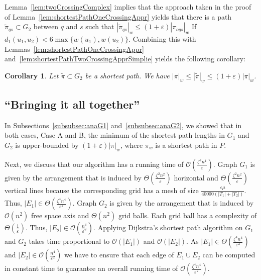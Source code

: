\documentclass[a4paper,11pt]{article}
\newtheorem{corollary}{Corollary}
\begin{document}
	Lemma~\ref{lem:twoCrossingComplex} implies that the  approach taken in the proof of Lemma~\ref{lem:shortestPathOneCrossingAppr} yields that there is a path $\widetilde{\pi}_{qs} \subset G_2$ between $q$ and $s$ such that $|\widetilde{\pi}_{qs}|_w \leq (1+\varepsilon) |\pi_{oqs}|_w$ If $d_1(u_1,u_2) < 6 \max \{ w(u_1), w(u_2) \}$. Combining this with Lemmas~\ref{lem:shortestPathOneCrossingAppr} and~\ref{lem:shortestPathTwoCrossingApprSimplie} yields the following corollary:

\begin{corollary}\label{cor:apprC2}
	Let $\widetilde{\pi} \subset G_2$ be a shortest path. We have $|\pi|_w \leq |\widetilde{\pi}|_w \leq (1+\varepsilon)|\pi|_w$.
\end{corollary}

\subsection{``Bringing it all together''}

	In Subsections~\ref{subsubsec:anaG1} and~\ref{subsubsec:anaG2}, we showed that in both  cases, Case A and B,  the minimum of the shortest path lengths in $G_1$ and $G_2$ is upper-bounded by $(1+\varepsilon)|\pi|_w$, where $\pi_w$ is a shortest path in $P$. 

	Next, we discuss that our algorithm has a running time of $\mathcal{O}(\frac{\zeta^4 n^4}{\varepsilon})$. Graph $G_1$ is given by the arrangement that is induced by $\Theta(\frac{\zeta^2 n^2}{\varepsilon})$ horizontal and $\Theta(\frac{\zeta^2 n^2}{\varepsilon})$ vertical lines because the corresponding grid has a mesh of size  $\frac{\varepsilon \mu}{40000 (|T_1| + |T_2|)}$. Thus, $|E_1| \in \Theta(\frac{\zeta^4 n^4}{\varepsilon^2})$. Graph	$G_2$ is given by the arrangement that is induced by $\mathcal{O}(n^2)$ free space axis and $\Theta(n^2)$ grid balls. Each grid ball has a complexity of $\Theta (\frac{1}{\varepsilon})$. Thus, $|E_2| \in \mathcal{O}(\frac{n^4}{\varepsilon^2})$. Applying Dijkstra's  shortest path algorithm on $G_1$ and $G_2$ takes time proportional to  $\mathcal{O}(|E_1|)$ and $\mathcal{O}(|E_2|)$. 
As $|E_1| \in \Theta(\frac{\zeta^4 n^4}{\varepsilon^2})$ and $|E_2| \in \mathcal{O}(\frac{n^4}{\varepsilon^2})$ we have to ensure that each edge of $E_1 \cup E_2$ can be computed in constant time to guarantee an overall running time of $\mathcal{O}(\frac{\zeta^4 n^4}{\varepsilon^2})$.
\end{document}
